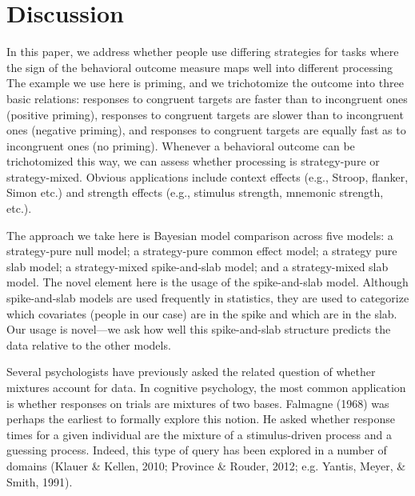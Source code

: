 \documentclass[english,man]{apa6}
\theoremstyle{definition}
\theoremstyle{definition}
\theoremstyle{remark}
\begin{document}
\section{Discussion}\label{discussion}

In this paper, we address whether people use differing strategies for
tasks where the sign of the behavioral outcome measure maps well into
different processing The example we use here is priming, and we
trichotomize the outcome into three basic relations: responses to
congruent targets are faster than to incongruent ones (positive
priming), responses to congruent targets are slower than to incongruent
ones (negative priming), and responses to congruent targets are equally
fast as to incongruent ones (no priming). Whenever a behavioral outcome
can be trichotomized this way, we can assess whether processing is
strategy-pure or strategy-mixed. Obvious applications include context
effects (e.g., Stroop, flanker, Simon etc.) and strength effects (e.g.,
stimulus strength, mnemonic strength, etc.).

The approach we take here is Bayesian model comparison across five
models: a strategy-pure null model; a strategy-pure common effect model;
a strategy pure slab model; a strategy-mixed spike-and-slab model; and a
strategy-mixed slab model. The novel element here is the usage of the
spike-and-slab model. Although spike-and-slab models are used frequently
in statistics, they are used to categorize which covariates (people in
our case) are in the spike and which are in the slab. Our usage is
novel---we ask how well this spike-and-slab structure predicts the data
relative to the other models.

Several psychologists have previously asked the related question of
whether mixtures account for data. In cognitive psychology, the most
common application is whether responses on trials are mixtures of two
bases. Falmagne (1968) was perhaps the earliest to formally explore this
notion. He asked whether response times for a given individual are the
mixture of a stimulus-driven process and a guessing process. Indeed,
this type of query has been explored in a number of domains (Klauer \&
Kellen, 2010; Province \& Rouder, 2012; e.g. Yantis, Meyer, \& Smith,
1991).
\end{document}
